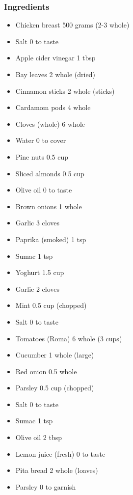 \documentclass[]{article}
\begin{document}
\subsubsection*{\Large Ingredients}
\begin{multicols}{2}
\begin{itemize}
 \item Chicken breast \hfill 500 grams (2-3 whole)
 \item Salt \hfill 0 to taste
 \item Apple cider vinegar \hfill 1 tbsp
 \item Bay leaves \hfill 2 whole (dried)
 \item Cinnamon sticks \hfill 2 whole (sticks)
 \item Cardamom pods \hfill 4 whole
 \item Cloves (whole) \hfill 6 whole
 \item Water \hfill 0 to cover
 \item Pine nuts \hfill 0.5 cup
 \item Sliced almonds \hfill 0.5 cup
 \item Olive oil \hfill 0 to taste
 \item Brown onions \hfill 1 whole
 \item Garlic \hfill 3 cloves
 \item Paprika (smoked) \hfill 1 tsp
 \item Sumac \hfill 1 tsp
 \item Yoghurt \hfill 1.5 cup
 \item Garlic \hfill 2 cloves
 \item Mint \hfill 0.5 cup (chopped)
 \item Salt \hfill 0 to taste
 \item Tomatoes (Roma) \hfill 6 whole (3 cups)
 \item Cucumber \hfill 1 whole (large)
 \item Red onion \hfill 0.5 whole
 \item Parsley \hfill 0.5 cup (chopped)
 \item Salt \hfill 0 to taste
 \item Sumac \hfill 1 tsp
 \item Olive oil \hfill 2 tbsp
 \item Lemon juice (fresh) \hfill 0 to taste
 \item Pita bread \hfill 2 whole (loaves)
 \item Parsley \hfill 0 to garnish
\end{itemize}
\end{multicols}
\end{document}
